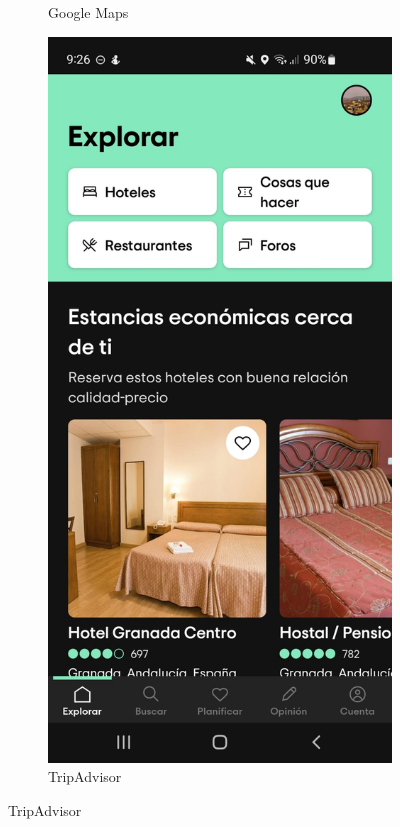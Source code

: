 \begin{figure}[H]
\begin{subfigure}{.3\textwidth}
        \caption{Google Maps}
        \label{fig:img2}
    \end{subfigure}%
    \hfill
    \begin{subfigure}{.3\textwidth}
        \centering
        \includegraphics[width=\linewidth]{imagenes/TripAdvisor1.jpeg}
        \caption{TripAdvisor}
        \label{fig:img3}
    \end{subfigure}


\end{figure}
